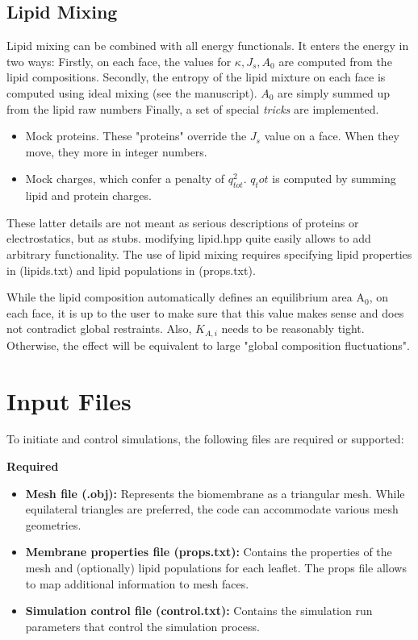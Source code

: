 \documentclass[11pt]{article}
\begin{document}
\subsection{Lipid Mixing}

Lipid mixing can be combined with all energy functionals. It enters the energy in two ways: Firstly, on each face, the values for $\kappa, J_s, A_0$ are computed from the lipid compositions. Secondly, the entropy of the lipid mixture on each face is computed using ideal mixing (see the manuscript). $A_0$ are simply summed up from the lipid raw numbers
Finally, a set of special \textit{tricks} are implemented. 
\begin{itemize}
    \item Mock proteins. These "proteins" override the $J_s$ value on a face. When they move, they more in integer numbers.
    \item Mock charges, which confer a penalty of $q_{tot}^2$. $q_tot$ is computed by summing lipid and protein charges.
\end{itemize}
These latter details are not meant as serious descriptions of proteins or electrostatics, but as stubs. modifying lipid.hpp quite easily allows to add arbitrary functionality. The use of lipid mixing requires specifying lipid properties in (lipids.txt) and lipid populations in (props.txt).
\begin{tcolorbox}[colback=orange!5!white,colframe=orange!75!black,title=Clarification]
While the lipid composition automatically defines an equilibrium area A$_0$, on each face, it is up to the user to make sure that this value makes sense and does not contradict global restraints. Also, $K_{A,i}$ needs to be reasonably tight. Otherwise, the effect will be equivalent to large "global composition fluctuations".
\end{tcolorbox}

\section{Input Files}

To initiate and control simulations, the following files are required or supported:

\textbf{Required}
\begin{itemize}
\item \textbf{Mesh file (.obj):} Represents the biomembrane as a triangular mesh. While equilateral triangles are preferred, the code can accommodate various mesh geometries.

\item \textbf{Membrane properties file (props.txt):} Contains the properties of the mesh and (optionally) lipid populations for each leaflet. The props file allows to map additional information to mesh faces.

\item \textbf{Simulation control file (control.txt):} Contains the simulation run parameters that control the simulation process.
\end{itemize}
\end{document}
